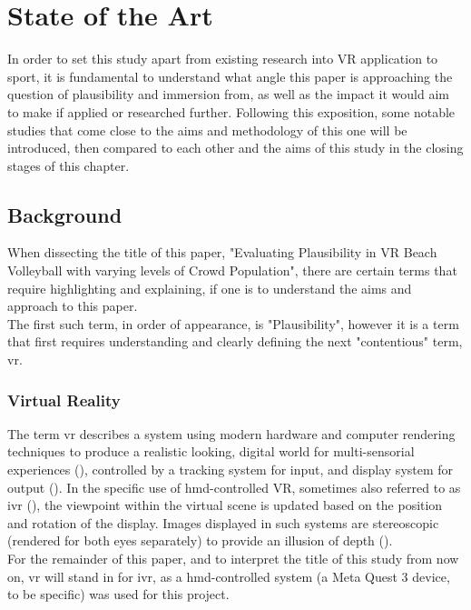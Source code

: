 \chapter{State of the Art}
\label{chap::sota-2}

In order to set this study apart from existing research into VR application to sport, it is fundamental to understand what angle this paper is approaching the question of plausibility and immersion from, as well as the impact it would aim to make if applied or researched further. Following this exposition, some notable studies that come close to the aims and methodology of this one will be introduced, then compared to each other and the aims of this study in the closing stages of this chapter.

\section{Background}

When dissecting the title of this paper, "Evaluating Plausibility in VR Beach Volleyball with varying levels of Crowd Population", there are certain terms that require highlighting and explaining, if one is to understand the aims and approach to this paper.\\
The first such term, in order of appearance, is "Plausibility", however it is a term that first requires understanding and clearly defining the next "contentious" term, \gls{vr}.

\subsection{Virtual Reality}

The term \acrlong{vr} describes a system using modern hardware and computer rendering techniques to produce a realistic looking, digital world for multi-sensorial experiences (\cite{farley-2020-virtual}), controlled by a tracking system for input, and display system for output (\cite{kulpa-2015-virtual}). In the specific use of \gls{hmd}-controlled VR, sometimes also referred to as \gls{ivr} (\cite{gerwann-2025-immersive}), the viewpoint within the virtual scene is updated based on the position and rotation of the display. Images displayed in such systems are stereoscopic (rendered for both eyes separately) to provide an illusion of depth (\cite{vignais-2015-technology}).\\

For the remainder of this paper, and to interpret the title of this study from now on, \gls{vr} will stand in for \gls{ivr}, as a \gls{hmd}-controlled system (a Meta Quest 3 device, to be specific) was used for this project.

